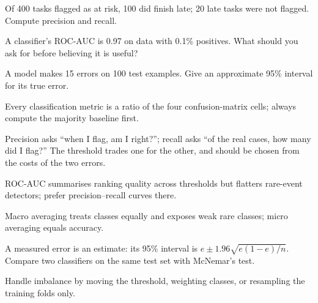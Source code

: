 \begin{checkpoint}
\begin{tightnum}
  \item Of 400 tasks flagged as at risk, 100 did finish late; 20 late tasks were
        not flagged. Compute precision and recall.
  \item A classifier's ROC-AUC is 0.97 on data with 0.1\% positives. What should
        you ask for before believing it is useful?
  \item A model makes 15 errors on 100 test examples. Give an approximate 95\%
        interval for its true error.
\end{tightnum}
\end{checkpoint}

\begin{chaptersummary}
\begin{tight}
  \item Every classification metric is a ratio of the four confusion-matrix
        cells; always compute the majority baseline first.
  \item Precision asks ``when I flag, am I right?''; recall asks ``of the real
        cases, how many did I flag?'' The threshold trades one for the other,
        and should be chosen from the costs of the two errors.
  \item ROC-AUC summarises ranking quality across thresholds but flatters
        rare-event detectors; prefer precision--recall curves there.
  \item Macro averaging treats classes equally and exposes weak rare classes;
        micro averaging equals accuracy.
  \item A measured error is an estimate: its 95\% interval is
        $e \pm 1.96\sqrt{e(1-e)/n}$. Compare two classifiers on the same test set
        with McNemar's test.
  \item Handle imbalance by moving the threshold, weighting classes, or
        resampling the training folds only.
\end{tight}
\end{chaptersummary}

